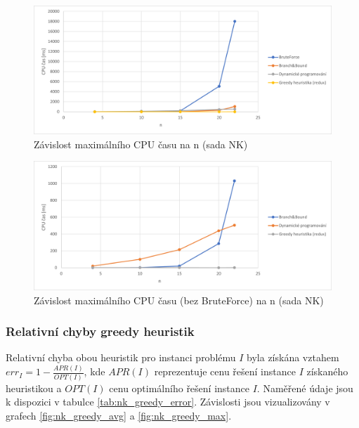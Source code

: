 \documentclass[12pt]{article}
\begin{document}
\begin{figure}[ht]\centering
    \includegraphics[width=1\textwidth, keepaspectratio]{graphs/NK/times/nk_cpu_time_max.png}
    \caption{Závislost maximálního CPU času na n (sada NK)}
    \label{fig:nk_cpu_time_max}
\end{figure}

\begin{figure}[ht]\centering
    \includegraphics[width=1\textwidth, keepaspectratio]{graphs/NK/times/nk_cpu_time_max_without_brute_force.png}
    \caption{Závislost maximálního CPU času (bez BruteForce) na n (sada NK)}
    \label{fig:nk_cpu_time_max_without_brute_force}
\end{figure}

\subsubsection{Relativní chyby greedy heuristik}

Relativní chyba obou heuristik pro instanci problému $I$ byla získána vztahem $err_I = 1 - \frac{APR(I)}{OPT(I)}$, kde $APR(I)$ reprezentuje cenu řešení instance $I$ získaného heuristikou a $OPT(I)$ cenu optimálního řešení instance $I$. Naměřené údaje jsou k dispozici v tabulce \ref{tab:nk_greedy_error}. Závislosti jsou vizualizovány v grafech \ref{fig:nk_greedy_avg} a \ref{fig:nk_greedy_max}.
\end{document}
